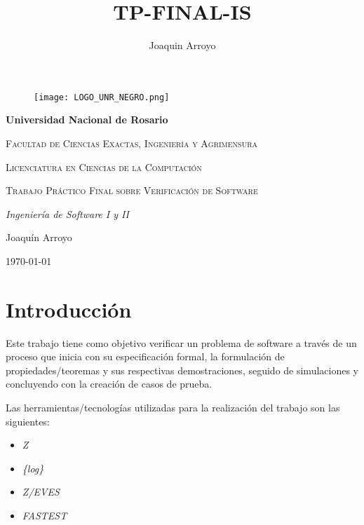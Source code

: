 \documentclass[fleqn,colorlinks,linkcolor=blue,citecolor=blue,urlcolor=blue]{article}
\title{TP-FINAL-IS}
\author{Joaquin Arroyo}
\begin{document}
\begin{titlepage}
    \centering
    \begin{figure}
        \centering
        \texttt{[image: LOGO\_UNR\_NEGRO.png]}
    \end{figure}
    {\bfseries\LARGE Universidad Nacional de Rosario \par}
    \vspace{1cm}
    {\scshape\Large Facultad de Ciencias Exactas, Ingeniería y Agrimensura  \par}
    \vspace{0.2cm}
    {\scshape\large Licenciatura en Ciencias de la Computación \par}
    \vspace{3cm}
    {\scshape\Huge Trabajo Práctico Final sobre Verificación de Software \par}
    \vspace{3cm}
    {\itshape\Large Ingeniería de Software I y II\par}
    \vfill
    {\Large Joaquín Arroyo \par}
    \vfill
    \today
\end{titlepage}
\makeatletter

\tableofcontents
\newpage 

\section{Introducción}

Este trabajo tiene como objetivo verificar un problema de software a través de un proceso que inicia con su especificación formal, la formulación de propiedades/teoremas y sus respectivas demostraciones, seguido de simulaciones y concluyendo con la creación de casos de prueba.

\vspace{0.1cm}

Las herramientas/tecnologías utilizadas para la realización del trabajo son las siguientes:

\begin{itemize}
    \item \textit{Z}

    \item \textit{\{log\}}

    \item \textit{Z/EVES}

    \item \textit{FASTEST}
\end{itemize}
\end{document}
